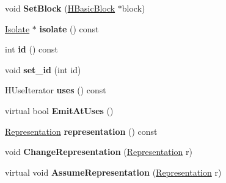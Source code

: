 \begin{DoxyCompactItemize}
\item 
void {\bfseries Set\+Block} (\hyperlink{classv8_1_1internal_1_1_h_basic_block}{H\+Basic\+Block} $\ast$block)\hypertarget{classv8_1_1internal_1_1_h_value_ad3063be7771a17420a827fcd56acd67e}{}\label{classv8_1_1internal_1_1_h_value_ad3063be7771a17420a827fcd56acd67e}

\item 
\hyperlink{classv8_1_1internal_1_1_isolate}{Isolate} $\ast$ {\bfseries isolate} () const \hypertarget{classv8_1_1internal_1_1_h_value_a6414479c82d49fd1edb2b17d2fa42a0f}{}\label{classv8_1_1internal_1_1_h_value_a6414479c82d49fd1edb2b17d2fa42a0f}

\item 
int {\bfseries id} () const \hypertarget{classv8_1_1internal_1_1_h_value_a0111a91ef51b27d2aa7c498336fab254}{}\label{classv8_1_1internal_1_1_h_value_a0111a91ef51b27d2aa7c498336fab254}

\item 
void {\bfseries set\+\_\+id} (int id)\hypertarget{classv8_1_1internal_1_1_h_value_ab5438bb2e24a64190d9befd4f7710bd6}{}\label{classv8_1_1internal_1_1_h_value_ab5438bb2e24a64190d9befd4f7710bd6}

\item 
H\+Use\+Iterator {\bfseries uses} () const \hypertarget{classv8_1_1internal_1_1_h_value_a86039f965901302ac35af6405319521a}{}\label{classv8_1_1internal_1_1_h_value_a86039f965901302ac35af6405319521a}

\item 
virtual bool {\bfseries Emit\+At\+Uses} ()\hypertarget{classv8_1_1internal_1_1_h_value_a3aa6ef688379d6642267f19951b7fd11}{}\label{classv8_1_1internal_1_1_h_value_a3aa6ef688379d6642267f19951b7fd11}

\item 
\hyperlink{classv8_1_1internal_1_1_representation}{Representation} {\bfseries representation} () const \hypertarget{classv8_1_1internal_1_1_h_value_a99cd37410471bb8fead728700e1cf02e}{}\label{classv8_1_1internal_1_1_h_value_a99cd37410471bb8fead728700e1cf02e}

\item 
void {\bfseries Change\+Representation} (\hyperlink{classv8_1_1internal_1_1_representation}{Representation} r)\hypertarget{classv8_1_1internal_1_1_h_value_a61c73dfe70c6ca204e168b7d58152ae8}{}\label{classv8_1_1internal_1_1_h_value_a61c73dfe70c6ca204e168b7d58152ae8}

\item 
virtual void {\bfseries Assume\+Representation} (\hyperlink{classv8_1_1internal_1_1_representation}{Representation} r)\hypertarget{classv8_1_1internal_1_1_h_value_a6eedc25cb28d18fbab17b5bc5386293b}{}\label{classv8_1_1internal_1_1_h_value_a6eedc25cb28d18fbab17b5bc5386293b}


\end{DoxyCompactItemize}
